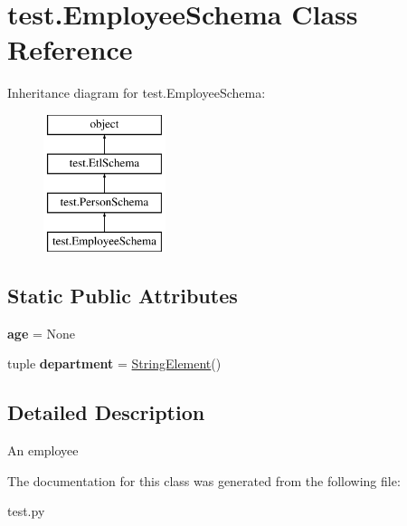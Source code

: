 \hypertarget{classtest_1_1EmployeeSchema}{\section{test.\-Employee\-Schema Class Reference}
\label{classtest_1_1EmployeeSchema}
}
Inheritance diagram for test.\-Employee\-Schema\-:\begin{figure}[H]
\begin{center}
\leavevmode
\includegraphics[height=4.000000cm]{classtest_1_1EmployeeSchema}
\end{center}
\end{figure}
\subsection*{Static Public Attributes}
\begin{DoxyCompactItemize}
\item 
\hypertarget{classtest_1_1EmployeeSchema_ad98fa791afd2fe78935c7f188125ee67}{{\bfseries age} = None}\label{classtest_1_1EmployeeSchema_ad98fa791afd2fe78935c7f188125ee67}

\item 
\hypertarget{classtest_1_1EmployeeSchema_aea7b24f72d6fa321bd54c37c7106f227}{tuple {\bfseries department} = \hyperlink{classtest_1_1StringElement}{String\-Element}()}\label{classtest_1_1EmployeeSchema_aea7b24f72d6fa321bd54c37c7106f227}

\end{DoxyCompactItemize}


\subsection{Detailed Description}
\begin{DoxyVerb}An employee\end{DoxyVerb}
 

The documentation for this class was generated from the following file\-:\begin{DoxyCompactItemize}
\item 
test.\-py\end{DoxyCompactItemize}
